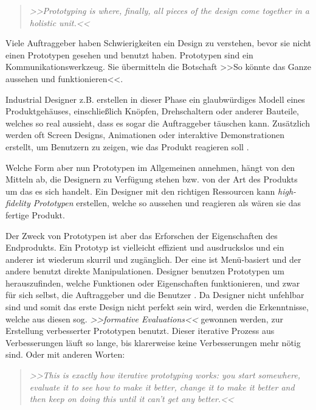 \begin{quote}
	\textsl{>>Prototyping is where, finally, all pieces of the design come together in a holistic unit.<<}
\begin{flushright}\citep{Saffer:2007}\end{flushright}
\end{quote}

Viele Auftraggeber haben Schwierigkeiten ein Design zu verstehen, bevor sie nicht einen Prototypen gesehen und benutzt haben. Prototypen sind ein Kommunikationswerkzeug. Sie übermitteln die Botschaft >>So könnte das Ganze aussehen und funktionieren<<.

\medskip Industrial Designer z.B. erstellen in dieser Phase ein glaubwürdiges Modell eines Produktgehäuses, einschließlich Knöpfen, Drehschaltern oder anderer Bauteile, welches so real aussieht, dass es sogar die Auftraggeber täuschen kann. Zusätzlich werden oft Screen Designs, Animationen oder interaktive Demonstrationen erstellt, um Benutzern zu zeigen, wie das Produkt reagieren soll \citep{Vertelney:1990}.

\medskip Welche Form aber nun Prototypen im Allgemeinen annehmen, hängt von den Mitteln ab, die Designern zu Verfügung stehen bzw. von der Art des Produkts um das es sich handelt. Ein Designer mit den richtigen Ressourcen kann \emph{high-fidelity Prototypen} erstellen, welche so aussehen und reagieren als wären sie das fertige Produkt.

Der Zweck von Prototypen ist aber das Erforschen der Eigenschaften des Endprodukts. Ein Prototyp ist vielleicht effizient und ausdruckslos und ein anderer ist wiederum skurril und zugänglich. Der eine ist Menü-basiert und der andere benutzt direkte Manipulationen. Designer benutzen Prototypen um herauszufinden, welche Funktionen oder Eigenschaften funktionieren, und zwar für sich selbst, die Auftraggeber und die Benutzer \citep{Saffer:2007}. Da Designer nicht unfehlbar sind und somit das erste Design nicht perfekt sein wird, werden die Erkenntnisse, welche aus diesen sog. \emph{>>formative Evaluations<<} gewonnen werden, zur Erstellung verbesserter Prototypen benutzt. Dieser iterative Prozess aus Verbesserungen läuft so lange, bis klarerweise keine Verbesserungen mehr nötig sind. Oder mit anderen Worten: 

\begin{quote}
	\textsl{>>This is exactly how iterative prototyping works: you start somewhere, evaluate it to see how to make it better, change it to make it better and then keep on doing this until it can't get any better.<<}
\begin{flushright}\citep{Dix:2004}\end{flushright}
\end{quote}

